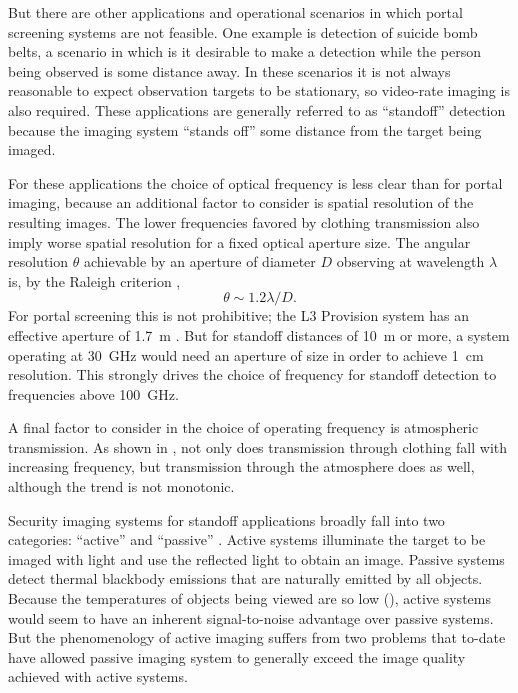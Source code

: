 But there are other applications and operational scenarios in which portal screening systems are not feasible.
One example is detection of suicide bomb belts, a scenario in which is it desirable to make a detection while the person being observed is some distance away.
In these scenarios it is not always reasonable to expect observation targets to be stationary, so video-rate imaging is also required.
These applications are generally referred to as ``standoff'' detection because the imaging system ``stands off'' some distance from the target being imaged.

For these applications the choice of optical frequency is less clear than for portal imaging, because an additional factor to consider is spatial resolution of the resulting images.
The lower frequencies favored by clothing transmission also imply worse spatial resolution for a fixed optical aperture size.
The angular resolution $\theta$ achievable by an aperture of diameter $D$ observing at wavelength $\lambda$ is, by the Raleigh criterion \cite{born_principles_1999},
\begin{equation} \label{eqn:ch1-raleigh}
  \theta \sim 1.2 \lambda / D.
\end{equation}
For portal screening this is not prohibitive; the L3 Provision system has an effective aperture of \SI{1.7}{\m} \cite{mcmakin_dual-surface_2009}.
But for standoff distances of \SI{10}{\m} or more, a system operating at \SI{30}{\GHz} would need an aperture of size  in order to achieve \SI{1}{\cm} resolution.
This strongly drives the choice of frequency for standoff detection to frequencies above \SI{100}{\GHz}.

A final factor to consider in the choice of operating frequency is atmospheric transmission.
As shown in , not only does transmission through clothing fall with increasing frequency, but transmission through the atmosphere does as well, although the trend is not monotonic.

Security imaging systems for standoff applications broadly fall into two categories: ``active'' and ``passive'' \cite{appleby_standoff_2007,appleby_passive_2004}.
Active systems illuminate the target to be imaged with light and use the reflected light to obtain an image.
Passive systems detect thermal blackbody emissions that are naturally emitted by all objects.
Because the temperatures of objects being viewed are so low (), active systems would seem to have an inherent signal-to-noise advantage over passive systems.
But the phenomenology of active imaging suffers from two problems that to-date have allowed passive imaging system to generally exceed the image quality achieved with active systems.

